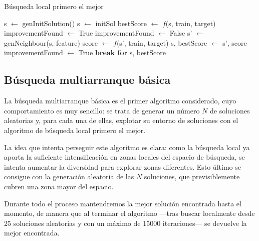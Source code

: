\documentclass[a4paper, 11pt, titlepage]{article}
\begin{document}
    \begin{algorithm}
        \caption{Búsqueda local primero el mejor}\label{primMejor}
        \begin{algorithmic}
                \State s $\gets$ genInitSolution()
            \Else
                \State s $\gets$ initSol
            \EndIf
            \State bestScore $\gets$ $f$(s, train, target)
            \State improvementFound $\gets$ True
                \State improvementFound $\gets$ False
                 
                    \State s' $\gets$ genNeighbour(s, feature)
                    \State score $\gets$ $f$(s', train, target)
                        \State s, bestScore $\gets$ s', score
                        \State improvementFound $\gets$ True
                        \State \textbf{break for}
                    \EndIf
                \EndFor
            \EndWhile
            \State \Return s, bestScore
        \end{algorithmic}
    \end{algorithm}

    \subsection{Búsqueda multiarranque básica}

    La búsqueda multiarranque básica es el primer algoritmo considerado, cuyo comportamiento es muy sencillo: se trata de generar un número $N$ de soluciones aleatorias y, para cada una de ellas, explotar su entorno de soluciones con el algoritmo de búsqueda local primero el mejor.

    La idea que intenta perseguir este algoritmo es clara: como la búsqueda local ya aporta la suficiente intensificación en zonas locales del espacio de búsqueda, se intenta aumentar la diversidad para explorar zonas diferentes. Esto último se consigue con la generación aleatoria de las $N$ soluciones, que previsiblemente cubren una zona mayor del espacio.

    Durante todo el proceso mantendremos la mejor solución encontrada hasta el momento, de manera que al terminar el algoritmo ---tras buscar localmente desde 25 soluciones aleatorias y con un máximo de 15000 iteraciones--- se devuelve la mejor encontrada.
\end{document}
